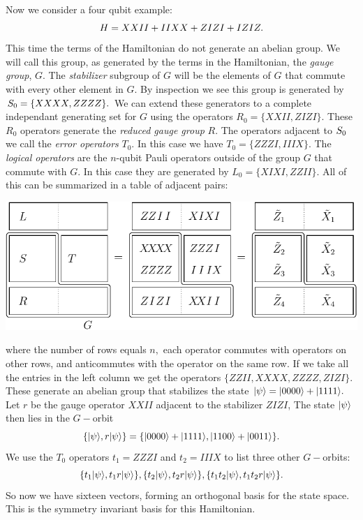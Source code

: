Now we consider a four qubit example:
$$
    H = XXII + IIXX + ZIZI + IZIZ.
$$
This time the terms of the Hamiltonian do not generate 
an abelian group.
We will call this group, as generated by the terms in the Hamiltonian,
the \emph{gauge group}, $G$.
The \emph{stabilizer} subgroup of $G$ will be the elements of $G$
that commute with every other element in $G.$
By inspection we see this group is generated by $S_0=\{XXXX, ZZZZ\}.$
We can extend these generators to a complete independant generating
set for $G$ using the operators  $R_0=\{XXII, ZIZI\}.$
These $R_0$ operators generate the \emph{reduced gauge group} $R.$
The operators adjacent to $S_0$ we
call the \emph{error operators} $T_0$. 
In this case we have $T_0 = \{ZZZI, IIIX\}.$
The \emph{logical operators} are the $n$-qubit 
Pauli operators outside of the group
$G$ that commute with $G.$
In this case they are generated by $L_0 = \{XIXI, ZZII\}.$
All of this can be summarized in a table of adjacent pairs:
\begin{center}
\includegraphics[]{pic-gauge4.pdf}
\end{center}
where the number of rows equals $n,$ 
each operator commutes with operators on other rows,
and anticommutes with the operator on the same row. 
If we take all the entries in the left column
we get the operators 
$\{ ZZII, XXXX, ZZZZ, ZIZI \}.$ 
These generate an abelian group 
that stabilizes the
state $|{\psi}\rangle = |{0000}\rangle+|{1111}\rangle.$
Let $r$ be the gauge operator $XXII$ adjacent to the 
stabilizer $ZIZI$,
The state $|{\psi}\rangle$ then lies in the $G-$orbit 
$$
\{|{\psi}\rangle, r|{\psi}\rangle\} = \{|{0000}\rangle+|{1111}\rangle, |{1100}\rangle+|{0011}\rangle\}.
$$
We use the $T_0$ operators $t_1=ZZZI$ and $t_2=IIIX$
to list three other $G-$orbits:
$$
\{t_1 |{\psi}\rangle, t_1 r|{\psi}\rangle\}, 
\{t_2 |{\psi}\rangle, t_2 r|{\psi}\rangle\}, 
\{t_1 t_2 |{\psi}\rangle, t_1 t_2 r|{\psi}\rangle\}.
$$
So now we have sixteen vectors, forming an orthogonal basis for the state space.
This is the symmetry invariant basis for this Hamiltonian.

